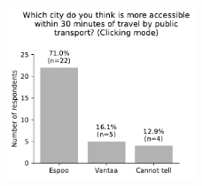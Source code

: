 \begin{appendices}
\begin{figure}[H]
	\includegraphics[width=0.5\textwidth]{visual/figures/survey/2.pdf}
	\newline
\end{figure}


\end{appendices}
